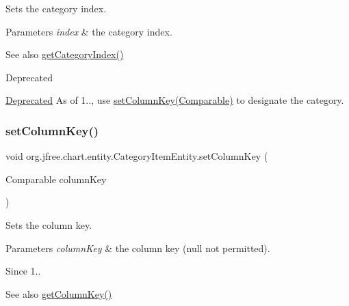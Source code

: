 Sets the category index.


\begin{DoxyParams}{Parameters}
{\em index} & the category index.\\
\hline
\end{DoxyParams}
\begin{DoxySeeAlso}{See also}
\mbox{\hyperlink{classorg_1_1jfree_1_1chart_1_1entity_1_1_category_item_entity_ab7478ee780434b41127a0b3ac87887dc}{get\+Category\+Index()}}
\end{DoxySeeAlso}
\begin{DoxyRefDesc}{Deprecated}
\item[\mbox{\hyperlink{deprecated__deprecated000046}{Deprecated}}]As of 1.., use \mbox{\hyperlink{classorg_1_1jfree_1_1chart_1_1entity_1_1_category_item_entity_ab91210c9acc7d24595eca4a5a414b85d}{set\+Column\+Key(\+Comparable)}} to designate the category. \end{DoxyRefDesc}
\mbox{\label{classorg_1_1jfree_1_1chart_1_1entity_1_1_category_item_entity_ab91210c9acc7d24595eca4a5a414b85d}} 
\subsubsection{\texorpdfstring{set\+Column\+Key()}{setColumnKey()}}
{\footnotesize\ttfamily void org.\+jfree.\+chart.\+entity.\+Category\+Item\+Entity.\+set\+Column\+Key (\begin{DoxyParamCaption}\item[{Comparable}]{column\+Key }\end{DoxyParamCaption})}

Sets the column key.


\begin{DoxyParams}{Parameters}
{\em column\+Key} & the column key ({\ttfamily null} not permitted).\\
\hline
\end{DoxyParams}
\begin{DoxySince}{Since}
1..
\end{DoxySince}
\begin{DoxySeeAlso}{See also}
\mbox{\hyperlink{classorg_1_1jfree_1_1chart_1_1entity_1_1_category_item_entity_a8c5694b51e2b552e71fc31ef3a291b80}{get\+Column\+Key()}} 
\end{DoxySeeAlso}
\mbox{\label{classorg_1_1jfree_1_1chart_1_1entity_1_1_category_item_entity_aded36783035f03d00b1c0b8625b0a7bd}} 
